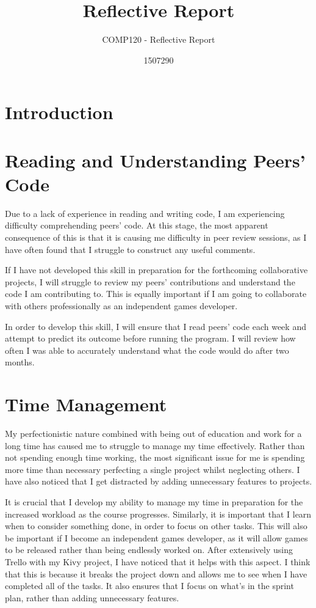 \documentclass{scrartcl}
\title{Reflective Report}
\subtitle{COMP120 - Reflective Report}
\author{1507290}
\begin{document}
\maketitle

\abstract{}

\section{Introduction}

\section{Reading and Understanding Peers' Code}
Due to a lack of experience in reading and writing code, I am experiencing difficulty comprehending peers' code. At this stage, the most apparent consequence of this is that it is causing me difficulty in peer review sessions, as I have often found that I struggle to construct any useful comments.

If I have not developed this skill in preparation for the forthcoming collaborative projects, I will struggle to review my peers' contributions and understand the code I am contributing to. This is equally important if I am going to collaborate with others professionally as an independent games developer.

In order to develop this skill, I will ensure that I read peers' code each week and attempt to predict its outcome before running the program. I will review how often I was able to accurately understand what the code would do after two months.

\section{Time Management}
My perfectionistic nature combined with being out of education and work for a long time has caused me to struggle to manage my time effectively. Rather than not spending enough time working, the most significant issue for me is spending more time than necessary perfecting a single project whilst neglecting others. I have also noticed that I get distracted by adding unnecessary features to projects. 

It is crucial that I develop my ability to manage my time in preparation for the increased workload as the course progresses. Similarly, it is important that I learn when to consider something done, in order to focus on other tasks. This will also be important if I become an independent games developer, as it will allow games to be released rather than being endlessly worked on. After extensively using Trello with my Kivy project, I have noticed that it helps with this aspect. I think that this is because it breaks the project down and allows me to see when I have completed all of the tasks. It also ensures that I focus on what's in the sprint plan, rather than adding unnecessary features.
\end{document}
